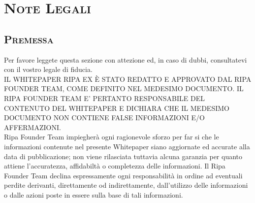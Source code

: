 

\chapter{\textsc{Note Legali}}
\begin{scriptsize}
	{\scshape
		\section{\textsc{Premessa}}
		Per favore leggete questa sezione con attezione ed, in caso di dubbi, consultatevi con il vostro legale di fiducia.\\
		\textsc{IL WHITEPAPER RIPA EX È STATO REDATTO E APPROVATO DAL RIPA FOUNDER TEAM, COME DEFINITO NEL MEDESIMO DOCUMENTO. 
		IL RIPA FOUNDER TEAM E’ PERTANTO RESPONSABILE DEL CONTENUTO DEL WHITEPAPER E DICHIARA CHE IL MEDESIMO DOCUMENTO NON CONTIENE 
		FALSE INFORMAZIONI E/O AFFERMAZIONI.}\\
		Ripa Founder Team  impiegherà ogni ragionevole sforzo per far si che le informazioni contenute nel presente Whitepaper 
		siano aggiornate ed accurate alla data di pubblicazione; non viene rilasciata tuttavia alcuna garanzia per quanto attiene 
		l’accuratezza, affidabiltà o completezza delle informazioni. Il Ripa Founder Team declina espressamente ogni responsabilità 
		in ordine ad eventuali perdite derivanti, direttamente od indirettamente, dall’utilizzo delle informazioni o dalle azioni 
		poste in essere sulla base di tali informazioni.
}
\end{scriptsize}
